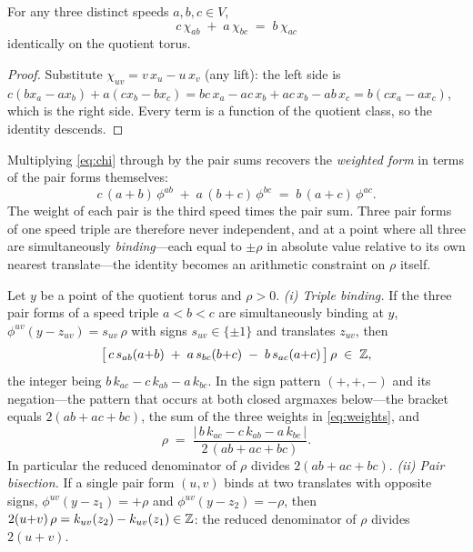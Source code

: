 \begin{lemma}\label{lem:chi}
For any three distinct speeds $a,b,c\in V$,
\begin{equation}\label{eq:chi}
c\,\chi_{ab}\;+\;a\,\chi_{bc}\;=\;b\,\chi_{ac}
\end{equation}
identically on the quotient torus.
\end{lemma}

\begin{proof}
Substitute $\chi_{uv}=v\,x_u-u\,x_v$ (any lift): the left side is
$c(bx_a-ax_b)+a(cx_b-bx_c)=bc\,x_a-ac\,x_b+ac\,x_b-ab\,x_c
=b(cx_a-ax_c)$, which is the right side. Every term is a function of
the quotient class, so the identity descends.
\end{proof}

Multiplying \eqref{eq:chi} through by the pair sums recovers the
\emph{weighted form} in terms of the pair forms themselves:
\begin{equation}\label{eq:weights}
c\,(a{+}b)\,\phi^{ab}\;+\;a\,(b{+}c)\,\phi^{bc}\;=\;
b\,(a{+}c)\,\phi^{ac}.
\end{equation}
The weight of each pair is the third speed times the pair sum. Three
pair forms of one speed triple are therefore never independent, and at a
point where all three are simultaneously \emph{binding}---each equal to
$\pm\rho$ in absolute value relative to its own nearest translate---the
identity becomes an arithmetic constraint on $\rho$ itself.

\begin{corollary}\label{cor:denom}
Let $y$ be a point of the quotient torus and $\rho>0$.
\emph{(i) Triple binding.} If the three pair forms of a speed triple
$a<b<c$ are simultaneously binding at $y$,
$\phi^{uv}(y-z_{uv})=s_{uv}\,\rho$ with signs $s_{uv}\in\{\pm1\}$ and
translates $z_{uv}$, then
\[
\bigl[\,c\,s_{ab}(a{+}b)\;+\;a\,s_{bc}(b{+}c)\;-\;b\,s_{ac}(a{+}c)\,
\bigr]\,\rho\;\in\;\mathbb{Z},
\]
the integer being $b\,k_{ac}-c\,k_{ab}-a\,k_{bc}$. In the sign pattern
$(+,+,-)$ and its negation---the pattern that occurs at both closed
argmaxes below---the bracket equals $2(ab{+}ac{+}bc)$, the sum of the
three weights in \eqref{eq:weights}, and
\[
\rho\;=\;\frac{\bigl|\,b\,k_{ac}-c\,k_{ab}-a\,k_{bc}\,\bigr|}
{2\,(ab+ac+bc)}.
\]
In particular the reduced denominator of $\rho$ divides
$2(ab+ac+bc)$.
\emph{(ii) Pair bisection.} If a single pair form $(u,v)$ binds at two
translates with opposite signs, $\phi^{uv}(y-z_1)=+\rho$ and
$\phi^{uv}(y-z_2)=-\rho$, then $2(u{+}v)\,\rho=k_{uv}(z_2)-k_{uv}(z_1)
\in\mathbb{Z}$: the reduced denominator of $\rho$ divides $2(u+v)$.
\end{corollary}

